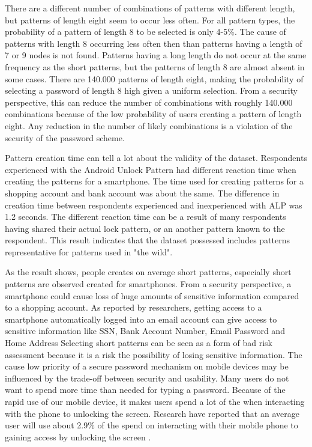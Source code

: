       There are a different number of combinations of patterns with different length, but patterns of length eight seem to occur less often. For all pattern types, the probability of a pattern of length 8 to be selected is only 4-5\%. The cause of patterns with length 8 occurring less often then than patterns having a length of 7 or 9 nodes is not found. Patterns having a long length do not occur at the same frequency as the short patterns, but the patterns of length 8 are almost absent in some cases. There are 140.000 patterns of length eight, making the probability of selecting a password of length 8 high given a uniform selection. From a security perspective, this can reduce the number of combinations with roughly 140.000 combinations because of the low probability of users creating a pattern of length eight. Any reduction in the number of likely combinations is a violation of the security of the password scheme.

      Pattern creation time can tell a lot about the validity of the dataset. Respondents experienced with the Android Unlock Pattern had different reaction time when creating the patterns for a smartphone. The time used for creating patterns for a shopping account and bank account was about the same. The difference in creation time between respondents experienced and inexperienced with ALP was 1.2 seconds. The different reaction time can be a result of many respondents having shared their actual lock pattern, or an another pattern known to the respondent. This result indicates that the dataset possessed includes patterns representative for patterns used in "the wild". 

      As the result shows, people creates on average short patterns, especially short patterns are observed created for smartphones. From a security perspective, a smartphone could cause loss of huge amounts of sensitive information compared to a shopping account. As reported by researchers, getting access to a smartphone automatically logged into an email account can give access to sensitive information like SSN, Bank Account Number, Email Password and Home Address \cite{Egelman}
      Selecting short patterns can be seen as a form of bad risk assessment because it is a risk the possibility of losing sensitive information. The cause low priority of a secure password mechanism on mobile devices may be influenced by the trade-off between security and usability. Many users do not want to spend more time than needed for typing a password. Because of the rapid use of our mobile device, it makes users spend a lot of the when interacting with the phone to unlocking the screen. Research have reported that an average user will use about 2.9\% of the spend on interacting with their mobile phone to gaining access by unlocking the screen \cite{habits3}.

